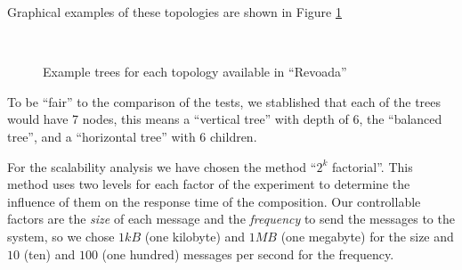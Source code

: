 Graphical examples of these topologies are shown in Figure \ref{trees}

\begin{figure}[htb]
	\centering
	 \qquad
	 \\
	\caption{Example trees for each topology available in ``Revoada''}%
	\label{trees}
\end{figure}


To be ``fair'' to the comparison of the tests, we stablished that each of the trees would have 7 nodes, this means a ``vertical tree'' with depth of 6, the ``balanced tree'', and a ``horizontal tree'' with 6 children.

For the scalability analysis we have chosen the method ``$2^k$ factorial''. This method uses two levels for each factor of the experiment to determine the influence of them on the response time of the composition. Our controllable factors are the \emph{size} of each message and the \emph{frequency} to send the messages to the system, so we chose $1 kB$ (one kilobyte) and $1 MB$ (one megabyte) for the size and $10$ (ten) and $100$ (one hundred) messages per second for the frequency.

